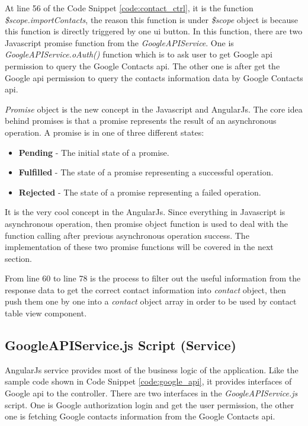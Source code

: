 \par At line 56 of the Code Snippet \ref{code:contact_ctrl}, it is the function \textit{\$scope.importContacts}, the reason this function is under \textit{\$scope} object is because this function is directly triggered by one \gls{ui} button. In this function, there are two Javascript promise function from the \textit{GoogleAPIService}. One is \textit{GoogleAPIService.oAuth()} function which is to ask user to get Google \gls{api} permission to query the Google Contacts \gls{api}. The other one is after get the Google \gls{api} permission to query the contacts information data by Google Contacts \gls{api}.

\par \textit{Promise} object is the new concept in the Javascript and AngularJs. The core idea behind promises is that a promise represents the result of an asynchronous operation. A promise is in one of three different states:\cite{website:promise}
\begin{itemize}[topsep=-1em,parsep=0em,itemsep=0em]
 \item \textbf{Pending} - The initial state of a promise.
 \item \textbf{Fulfilled} - The state of a promise representing a successful operation.
 \item \textbf{Rejected} - The state of a promise representing a failed operation.
\end{itemize}
It is the very cool concept in the AngularJs. Since everything in Javascript is asynchronous operation, then promise object function is used to deal with the function calling after previous asynchronous operation success. The implementation of these two promise functions will be covered in the next section.

\par From line 60 to line 78 is the process to filter out the useful information from the response data to get the correct contact information into \textit{contact} object, then push them one by one into a \textit{contact} object array in order to be used by contact table view component.

\subsection{GoogleAPIService.js Script (Service)}

\par AngularJs service provides most of the business logic of the application. Like the sample code shown in Code Snippet \ref{code:google_api}, it provides interfaces of Google \gls{api} to the controller. There are two interfaces in the \textit{GoogleAPIService.js} script. One is Google authorization login and get the user permission, the other one is fetching Google contacts information from the Google Contacts \gls{api}.

